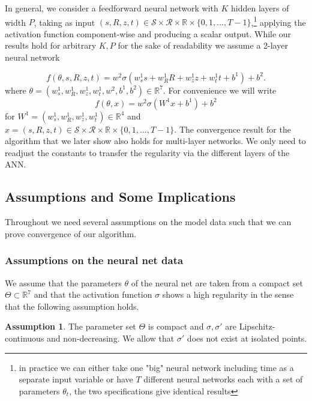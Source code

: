\documentclass[reqno, 11pt]{amsart}%
\newcommand\RR{\mathbb R}
\theoremstyle{definition}
\newtheorem{assumption}{Assumption}  %
\begin{document}
In general, we consider a feedforward neural network with $K$ hidden layers of width $P$, taking as input $(s,R,z,t) \in \mathcal{S}\times \mathcal R \times \mathbb{R} \times \{0,1,\ldots,T-1\}$,\footnote{in practice we can either take one "big" neural network including time as a separate input variable or have $T$ different neural networks each with a set of parameters $\theta_t$, the two specifications give identical results} applying the activation function component-wise and producing a scalar output.
While our results hold for arbitrary $K, P$ for the sake of readability we assume a 2-layer neural network  

\begin{equation}
	\label{eq:definition_NN_formula}
	f(\theta,s,R,z,t) =  w^2\sigma(w^1_s s + w^1_R R+ w^1_z z + w^1_t t+ b^1)+b^2. 
\end{equation}
where $\theta=(w^1_s,w_R^1,w_z^1,w_t^1,w^2,b^1,b^2)\in \RR^7.$ For convenience we will write
\begin{equation}
	\label{eq:definition_NN_formula2}
	f(\theta,x) =  w^2\sigma(W^1 x + b^1)+b^2 
\end{equation}
for $W^1=(w^1_s,w_R^1,w_z^1,w_t^1)\in \RR^4$ and $x=(s,R,z,t)\in \mathcal{S}\times \mathcal R \times \mathbb{R} \times \{0,1,\ldots,T-1\}.$
 The convergence result for the algorithm that we later show also holds for multi-layer networks. We only need to readjust the constants to transfer the regularity via the different layers of the ANN. 

\subsection{Assumptions and Some Implications}
Throughout we need several assumptions on the model data such that we can prove convergence of our algorithm.
\subsubsection{Assumptions on the neural net data}
We assume that the parameters $\theta$ of the neural net are taken from a compact set $\Theta\subset \RR^7$ and that the activation function $\sigma$ shows a high regularity in the sense that the following assumption holds.

\begin{assumption}
	\label{as:1} The parameter set $\Theta$ is compact and $\sigma, \sigma'$ are Lipschitz-continuous and non-decreasing. We allow that $\sigma'$ does not exist at isolated points.
\end{assumption}
\end{document}
